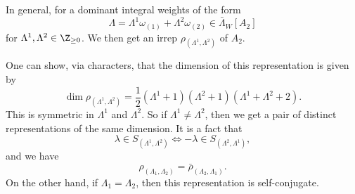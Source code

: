 \documentclass[a4paper]{article}
\begin{document}
\begin{eg}
\begin{center}
  \end{center}
  In general, for a dominant integral weights of the form
  \[
    \Lambda = \Lambda^1 \omega_{(1)} + \Lambda^2 \omega_{(2)} \in \bar{\Lambda}_W[A_2]
  \]
  for $\Lambda^1, \Lambda^2 \in \Z_{\geq 0}$. We then get an irrep $\rho_{(\Lambda^1, \Lambda^2)}$ of $A_2$.

  One can show, via characters, that the dimension of this representation is given by
  \[
    \dim \rho_{(\Lambda^1, \Lambda^2)} = \frac{1}{2} (\Lambda^1 + 1)(\Lambda^2 + 1)(\Lambda^1 + \Lambda^2 + 2).
  \]
  This is symmetric in $\Lambda^1$ and $\Lambda^2$. So if $\Lambda^1\not= \Lambda^2$, then we get a pair of distinct representations of the same dimension. It is a fact that
  \[
    \lambda \in S_{(\Lambda^1, \Lambda^2)} \Leftrightarrow -\lambda \in S_{(\Lambda^2, \Lambda^1)},
  \]
  and we have
  \[
    \rho_{(\Lambda_1, \Lambda_2)} = \bar{\rho}_{(\Lambda_2, \Lambda_1)}.
  \]
  On the other hand, if $\Lambda_1 = \Lambda_2$, then this representation is self-conjugate.


\end{eg}
\end{document}

